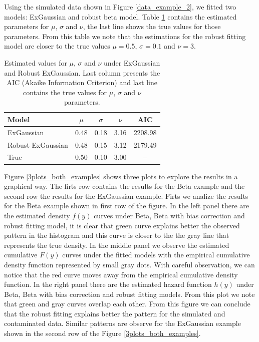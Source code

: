 \documentclass{article}
\begin{document}
Using the simulated data shown in Figure \ref{data_example_2}, we fitted two models: ExGaussian and robust beta model. Table \ref{res_example_2} contains the estimated parameters for $\mu$, $\sigma$ and $\nu$, the last line shows the true values for those parameters. From this table we note that the estimations for the robust fitting model are closer to the true values $\mu=0.5$, $\sigma=0.1$ and $\nu=3$.

\begin{table}[ht]
\centering
\begin{tabular}{lcccc}
  \hline
Model & $\mu$ & $\sigma$ & $\nu$ & AIC \\ \hline
ExGaussian & 0.48 & 0.18 & 3.16 & 2208.98 \\ 
Robust ExGaussian & 0.48 & 0.15 & 3.12 & 2179.49 \\ 
True & 0.50 & 0.10 & 3.00 & -- \\ \hline
\end{tabular}
\caption{Estimated values for $\mu$, $\sigma$ and $\nu$ under ExGaussian and Robust ExGaussian. Last column presents the AIC (Akaike Information Criterion) and last line contains the true values for $\mu$, $\sigma$ and $\nu$ parameters.}
\label{res_example_2}
\end{table}

Figure \ref{3plots_both_examples} shows three plots to explore the results in a graphical way. The firts row contains the results for the Beta example and the second row the results for the ExGaussian example. Firts we analize the results for the Beta example shown in first row of the figure. In the left panel there are the estimated density $f(y)$ curves under Beta, Beta with bias correction and robust fitting model, it is clear that green curve explains better the observed pattern in the histogram and this curve is closer to the the gray line that represents the true density. In the middle panel we observe the estimated cumulative $F(y)$ curves under the fitted models with the empirical cumulative density function represented by small gray dots. With careful observation, we can notice that the red curve moves away from the empirical cumulative density function. In the right panel there are the estimated hazard function $h(y)$ under Beta, Beta with bias correction and robust fitting models. From this plot we note that green and gray curves overlap each other. From this figure we can conclude that the robust fitting explains better the pattern for the simulated and contaminated data. Similar patterns are observe for the ExGaussian example shown in the second row of the Figure \ref{3plots_both_examples}.
\end{document}
